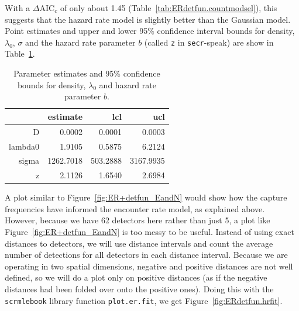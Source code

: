 \documentclass[graybox,envcountchap,sectrefs]{SpringerStyleFiles/styles/svmono}\usepackage[]{graphicx}\usepackage[]{color}
\begin{document}
\noindent
With a $\Delta$AIC$_c$ of only about 1.45 (Table~\ref{tab:ERdetfun.countmodsel}), this suggests that the hazard rate model is slightly better than the Gaussian model. Point estimates and upper and lower 95\% confidence interval bounds for density, $\lambda_0$, $\sigma$ and the hazard rate parameter $b$ (called \texttt{z} in \texttt{secr}-speak) are show in Table~\ref{tab:ERdetfun.countests}.

{\small
\begin{table}[ht]
\centering
\begin{tabular}{rrrr}
  \hline
 & estimate & lcl & ucl \\ 
  \hline
D & 0.0002 & 0.0001 & 0.0003 \\ 
  lambda0 & 1.9105 & 0.5875 & 6.2124 \\ 
  sigma & 1262.7018 & 503.2888 & 3167.9935 \\ 
  z & 2.1126 & 1.6540 & 2.6984 \\ 
   \hline
\end{tabular}
\caption{Parameter estimates and 95\% confidence bounds for density, $\lambda_0$ and hazard rate parameter $b$.} 
\label{tab:ERdetfun.countests}
\end{table}

} 


A plot similar to Figure~\ref{fig:ER+detfun_EandN} would show how the capture frequencies have informed the encounter rate model, as explained above. However, because we have 62 detectors here rather than just 5, a plot like Figure~\ref{fig:ER+detfun_EandN} is too messy to be useful. Instead of using exact distances to detectors, we will use distance intervals and count the average number of detections for all detectors in each distance interval. Because we are operating in two spatial dimensions, negative and positive distances are not well defined, so we will do a plot only on positive distances (as if the negative distances had been folded over onto the positive ones). Doing this with the \texttt{scrmlebook} library function \texttt{plot.er.fit}, we get Figure~\ref{fig:ERdetfun.hrfit}. 
\end{document}

